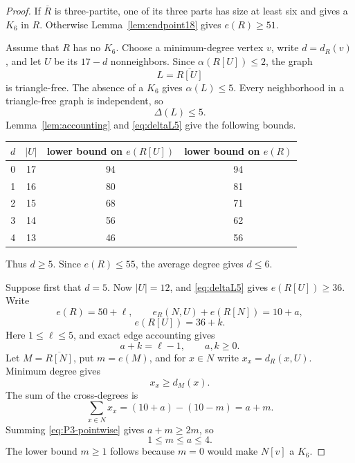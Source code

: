 \documentclass[11pt,reqno,a4paper]{amsart}
\theoremstyle{definition}
\theoremstyle{remark}
\newcommand{\comp}[1]{\overline{#1}}
\begin{document}
\begin{proof}
If $\comp R$ is three-partite, one of its three parts has size at least six
and gives a $K_6$ in $R$.  Otherwise Lemma~\ref{lem:endpoint18} gives
$e(R)\geq51$.

Assume that $R$ has no $K_6$.  Choose a minimum-degree vertex $v$, write
$d=d_R(v)$, and let $U$ be its $17-d$ nonneighbors.  Since
$\alpha(R[U])\leq2$, the graph
\[
  L=\comp{R[U]}
\]
is triangle-free.  The absence of a $K_6$ gives $\alpha(L)\leq5$.
Every neighborhood in a triangle-free graph is independent, so
\begin{equation}\label{eq:deltaL5}
  \Delta(L)\leq5.
\end{equation}
Lemma~\ref{lem:accounting} and \eqref{eq:deltaL5} give the following bounds.
\begin{center}
\begin{tabular}{c@{\qquad}c@{\qquad}c@{\qquad}c}
\toprule
$d$ & $|U|$ & lower bound on $e(R[U])$ & lower bound on $e(R)$\\
\midrule
0 & 17 & 94 & 94\\
1 & 16 & 80 & 81\\
2 & 15 & 68 & 71\\
3 & 14 & 56 & 62\\
4 & 13 & 46 & 56\\
\bottomrule
\end{tabular}
\end{center}
Thus $d\geq5$.  Since $e(R)\leq55$, the average degree gives $d\leq6$.

Suppose first that $d=5$.  Now $|U|=12$, and
\eqref{eq:deltaL5} gives $e(R[U])\geq36$.  Write
\[
  e(R)=50+\ell,\qquad
  e_R(N,U)+e(R[N])=10+a,
\]
\[
  e(R[U])=36+k.
\]
Here $1\leq\ell\leq5$, and exact edge accounting gives
\begin{equation}\label{eq:P3-shell}
  a+k=\ell-1,
  \qquad a,k\geq0.
\end{equation}
Let $M=\comp{R[N]}$, put $m=e(M)$, and for $x\in N$ write
$x_x=d_R(x,U)$.  Minimum degree gives
\begin{equation}\label{eq:P3-pointwise}
  x_x\geq d_M(x).
\end{equation}
The sum of the cross-degrees is
\[
  \sum_{x\in N}x_x=(10+a)-(10-m)=a+m.
\]
Summing \eqref{eq:P3-pointwise} gives $a+m\geq2m$, so
\begin{equation}\label{eq:P3-m}
  1\leq m\leq a\leq4.
\end{equation}
The lower bound $m\geq1$ follows because $m=0$ would make $N[v]$ a $K_6$.


\end{proof}
\end{document}
